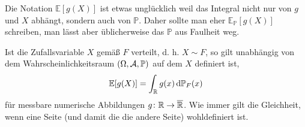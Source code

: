 \begin{bem1}
	Die Notation $\mathbb{E}[g(X)]$ ist etwas unglücklich weil das Integral nicht nur von $g$ und $X$ abh\"angt, sondern auch von $\mathbb P$. Daher sollte man eher  $\mathbb{E}_{\mathbb{P}}[g(X)]$ schreiben, man l\"asst aber \"ublicherweise das $\mathbb{P}$ aus Faulheit weg.
\end{bem1}

\begin{lemma}\label{ewTrafo}
	Ist die Zufallsvariable $X$ gem\"a\ss{} $F$ verteilt, d. h. $X\sim F$, so gilt unabhängig von dem Wahrscheinlichkeitsraum $(\Omega, \mathcal{A}, \mathbb{P})$ auf dem $X$ definiert ist,
	\[ \mathbb{E}[g(X)] = \int_{\mathbb{R}} g(x) \, \mathrm{d} \mathbb{P}_F(x) \]
	für messbare numerische Abbildungen $g \colon \mathbb{R} \to \overline{\mathbb{R}}$. Wie immer gilt die Gleichheit, wenn eine Seite (und damit die die andere Seite) wohldefiniert ist.
\end{lemma}

